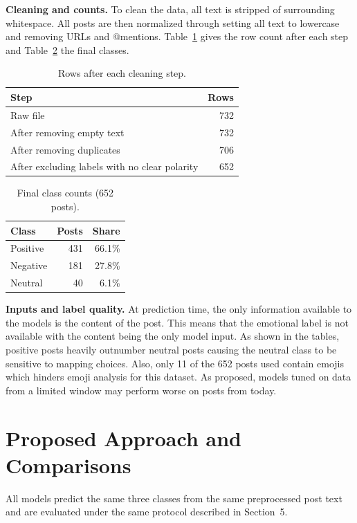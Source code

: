 \documentclass[sigconf,nonacm]{acmart}
\begin{document}
\textbf{Cleaning and counts.}
To clean the data, all text is stripped of surrounding whitespace. All posts are then normalized through setting all text to lowercase and removing URLs and @mentions. Table~\ref{tab:cleaning} gives the row count after each step and Table~\ref{tab:classes} the final classes. 

\begin{table}[h]
\caption{Rows after each cleaning step.}
\label{tab:cleaning}
\begin{tabular}{lr}
\toprule
Step & Rows \\
\midrule
Raw file & 732 \\
After removing empty text & 732 \\
After removing duplicates & 706 \\
After excluding labels with no clear polarity & 652 \\
\bottomrule
\end{tabular}
\end{table}
 
\begin{table}[h]
\caption{Final class counts (652 posts).}
\label{tab:classes}
\begin{tabular}{lrr}
\toprule
Class & Posts & Share \\
\midrule
Positive & 431 & 66.1\% \\
Negative & 181 & 27.8\% \\
Neutral & 40 & 6.1\% \\
\bottomrule
\end{tabular}
\end{table}

\textbf{Inputs and label quality.} 
At prediction time, the only information available to the models is the content of the post. This means that the emotional label is not available with the content being the only model input. As shown in the tables, positive posts heavily outnumber neutral posts causing the neutral class to be sensitive to mapping choices. Also, only 11 of the 652 posts used contain emojis which hinders emoji analysis for this dataset. As proposed, models tuned on data from a limited window may perform worse on posts from today.

\section{Proposed Approach and Comparisons}
All models predict the same three classes from the same preprocessed post text and are evaluated under the same protocol described in Section~5.
 
\end{document}
